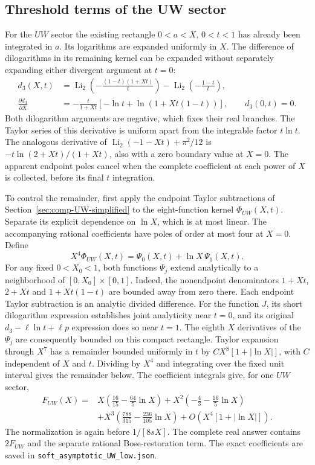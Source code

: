 \subsection{Threshold terms of the UW sector}
For the $UW$ sector the existing rectangle $0<a<X$, $0<t<1$ has already
been integrated in $a$.  Its logarithms are expanded uniformly in $X$.
The difference of dilogarithms in its remaining kernel can be expanded
without separately expanding either divergent argument at $t=0$:
\begin{align}
 d_3(X,t)&=\operatorname{Li}_2\!\left(-\frac{(1-t)(1+Xt)}t\right)
                  -\operatorname{Li}_2\!\left(-\frac{1-t}t\right),\\
 \frac{\partial d_3}{\partial X}
 &=-\frac{t}{1+Xt}\left[-\ln t+\ln(1+Xt(1-t))\right],
 \qquad d_3(0,t)=0.
\end{align}
Both dilogarithm arguments are negative, which fixes their real branches.
The Taylor series of this derivative is uniform apart from the integrable
factor $t\ln t$.  The analogous derivative of
$\operatorname{Li}_2(-1-Xt)+\pi^2/12$ is
$-t\ln(2+Xt)/(1+Xt)$, also with a zero boundary value at $X=0$.
The apparent endpoint poles cancel when the complete coefficient at each
power of $X$ is collected, before its final $t$ integration.

To control the remainder, first apply the endpoint Taylor subtractions
of Section~\ref{sec:comp-UW-simplified} to the eight-function kernel
$\Phi_{UW}(X,t)$. Separate its explicit dependence on $\ln X$, which
is at most linear. The accompanying rational coefficients have poles
of order at most four at $X=0$. Define
\begin{equation}
 X^4\Phi_{UW}(X,t)=\Psi_0(X,t)+\ln X\,\Psi_1(X,t).
\end{equation}
For any fixed $0<X_0<1$, both functions $\Psi_j$ extend analytically to
a neighborhood of $[0,X_0]\times[0,1]$. Indeed, the nonendpoint
denominators $1+Xt$, $2+Xt$ and $1+Xt(1-t)$ are bounded away from zero
there. Each endpoint Taylor subtraction is an analytic divided
difference. For the function $J$, its short dilogarithm expression
establishes joint analyticity near $t=0$, and its original
$d_3-\ell\ln t+\ell p$ expression does so near $t=1$.
The eighth $X$ derivatives of the $\Psi_j$ are consequently bounded
on this compact rectangle. Taylor expansion through $X^7$ has a
remainder bounded uniformly in $t$ by $C X^8[1+|\ln X|]$, with $C$
independent of $X$ and $t$. Dividing by $X^4$ and integrating over the
fixed unit interval gives the remainder below. The coefficient
integrals give, for one $UW$ sector,
\begin{align}
 F_{UW}(X)={}&X\left(\frac{16}{15}-\frac{64}{5}\ln X\right)
 +X^2\left(-\frac43-\frac{16}{5}\ln X\right)\\
 &+X^3\left(\frac{788}{315}-\frac{236}{105}\ln X\right)
                  +O\!\left(X^4[1+|\ln X|]\right).
\end{align}
The normalization is again before $1/[8s X]$.  The complete real answer
contains $2F_{UW}$ and the separate rational Bose-restoration term.
The exact coefficients are saved in \nolinkurl{soft_asymptotic_UW_low.json}.


